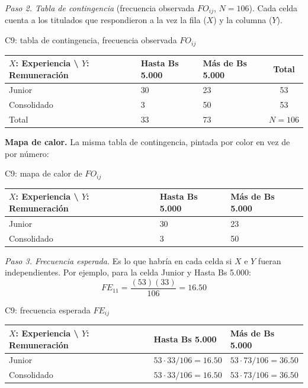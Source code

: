 \textit{Paso 2. Tabla de contingencia} (frecuencia observada $FO_{ij}$, $N = 106$). Cada celda cuenta a los titulados que respondieron a la vez la fila ($X$) y la columna ($Y$).

\begin{mitabla}{C9: tabla de contingencia, frecuencia observada $FO_{ij}$}
\begin{tabular}{L{3.8cm}C{3.00cm}C{3.00cm}|c}
\toprule
$X$: Experiencia \textbackslash{} $Y$: Remuneración & Hasta Bs 5.000 & Más de Bs 5.000 & Total \\
\midrule
Junior & 30 & 23 & 53 \\
Consolidado & 3 & 50 & 53 \\
\midrule
Total & 33 & 73 & $N = 106$ \\
\bottomrule
\end{tabular}
\end{mitabla}

\textbf{Mapa de calor.} La misma tabla de contingencia, pintada por color en vez de por número:

\begin{mitabla}{C9: mapa de calor de $FO_{ij}$}
\begin{tabular}{L{3.8cm}C{3.00cm}C{3.00cm}}
\toprule
$X$: Experiencia \textbackslash{} $Y$: Remuneración & Hasta Bs 5.000 & Más de Bs 5.000 \\
\midrule
Junior & 30 & 23 \\
Consolidado & 3 & 50 \\
\bottomrule
\end{tabular}
\end{mitabla}

\textit{Paso 3. Frecuencia esperada.} Es lo que habría en cada celda si $X$ e $Y$ fueran independientes. Por ejemplo, para la celda Junior y Hasta Bs 5.000:
\[
FE_{11} = \frac{(53)(33)}{106} = 16.50
\]

\begin{mitabla}{C9: frecuencia esperada $FE_{ij}$}
\begin{tabular}{L{3.8cm}C{3.00cm}C{3.00cm}}
\toprule
$X$: Experiencia \textbackslash{} $Y$: Remuneración & Hasta Bs 5.000 & Más de Bs 5.000 \\
\midrule
Junior & $53\cdot33/106 = 16.50$ & $53\cdot73/106 = 36.50$ \\
Consolidado & $53\cdot33/106 = 16.50$ & $53\cdot73/106 = 36.50$ \\
\bottomrule
\end{tabular}
\end{mitabla}

